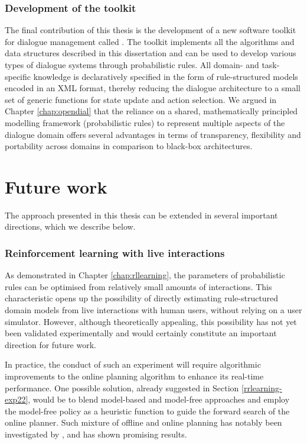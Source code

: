 

\subsubsection*{Development of the \opendial{} toolkit}

The final contribution of this thesis is the development of a new software toolkit for dialogue management called \opendial{}. The toolkit implements all the algorithms and data structures described in this dissertation and can be used to develop various types of dialogue systems through probabilistic rules. All domain- and task-specific knowledge is declaratively specified in the form of rule-structured models encoded in an XML format, thereby reducing the dialogue architecture to a small set of generic functions for state update and action selection.  We argued in Chapter \ref{chap:opendial} that the reliance on a shared, mathematically principled modelling framework (probabilistic rules) to represent multiple aspects of the dialogue domain offers several advantages in terms of transparency, flexibility and portability across domains in comparison to black-box architectures.

\section{Future work}

The approach presented in this thesis can be extended in several important directions, which we describe below. 

\subsubsection*{Reinforcement learning with live interactions}

As demonstrated in Chapter \ref{chap:rllearning}, the parameters of probabilistic rules can be optimised from relatively small amounts of interactions.  This characteristic opens up the possibility of directly estimating rule-structured domain models from live interactions with human users, without relying on a user simulator.  However, although theoretically appealing, this possibility has not yet been validated experimentally and would certainly constitute an important direction for future work.

In practice, the conduct of such an experiment will require algorithmic improvements to the online planning algorithm to enhance its real-time performance. One possible solution, already suggested in Section \ref{rrlearning-exp22}, would be to blend model-based and model-free approaches and employ the model-free policy as a heuristic function to guide the forward search of the online planner.  Such mixture of offline and online planning has notably been investigated by \cite{RossC07}, and has shown promising results.


